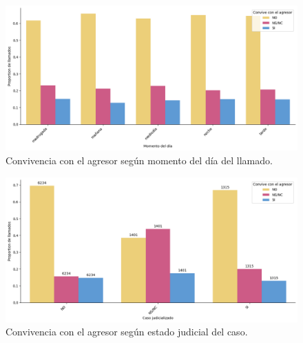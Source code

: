 \documentclass[10 pt]{article}
\begin{document}
       
\begin{figure}[H]
    \begin{center}
    \includegraphics[scale=.5]{images/latex_momento_dia_convive.png}
    \caption{Convivencia con el agresor según momento del día del llamado.}
    \label{momdiaconvive}
    \end{center}
    \end{figure}
    
    \begin{figure}[H]
    \begin{center}
    \includegraphics[scale=.5]{images/latex_caso_jud_convive.png}
    \caption{Convivencia con el agresor según estado judicial del caso.}
    \label{casojudconvive}
    \end{center}
    \end{figure}
\end{document}
